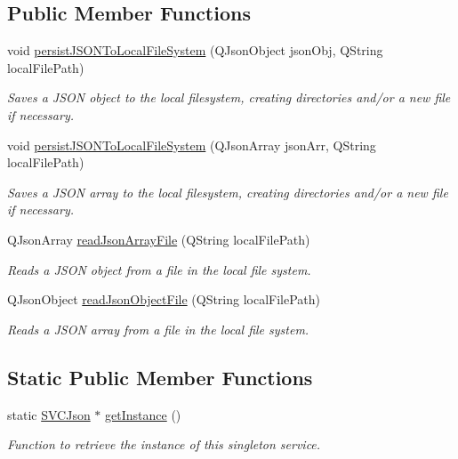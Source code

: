 \subsection*{Public Member Functions}
\begin{DoxyCompactItemize}
\item 
void \mbox{\hyperlink{class_s_v_c_json_a0977d01535e63b2cc76a0fb35cc17966}{persist\+J\+S\+O\+N\+To\+Local\+File\+System}} (Q\+Json\+Object json\+Obj, Q\+String local\+File\+Path)
\begin{DoxyCompactList}\small\item\em Saves a J\+S\+ON object to the local filesystem, creating directories and/or a new file if necessary. \end{DoxyCompactList}\item 
void \mbox{\hyperlink{class_s_v_c_json_a957845d6aad8c6acd176de1b9108bed5}{persist\+J\+S\+O\+N\+To\+Local\+File\+System}} (Q\+Json\+Array json\+Arr, Q\+String local\+File\+Path)
\begin{DoxyCompactList}\small\item\em Saves a J\+S\+ON array to the local filesystem, creating directories and/or a new file if necessary. \end{DoxyCompactList}\item 
Q\+Json\+Array \mbox{\hyperlink{class_s_v_c_json_a0f80c2f8372fdfe4158df6f49ccbe1ac}{read\+Json\+Array\+File}} (Q\+String local\+File\+Path)
\begin{DoxyCompactList}\small\item\em Reads a J\+S\+ON object from a file in the local file system. \end{DoxyCompactList}\item 
Q\+Json\+Object \mbox{\hyperlink{class_s_v_c_json_aacff71253cc41cb2a403cf2226038962}{read\+Json\+Object\+File}} (Q\+String local\+File\+Path)
\begin{DoxyCompactList}\small\item\em Reads a J\+S\+ON array from a file in the local file system. \end{DoxyCompactList}\end{DoxyCompactItemize}
\subsection*{Static Public Member Functions}
\begin{DoxyCompactItemize}
\item 
static \mbox{\hyperlink{class_s_v_c_json}{S\+V\+C\+Json}} $\ast$ \mbox{\hyperlink{class_s_v_c_json_a309123d2e8f34ba0ec02e73b024d53e5}{get\+Instance}} ()
\begin{DoxyCompactList}\small\item\em Function to retrieve the instance of this singleton service. \end{DoxyCompactList}\end{DoxyCompactItemize}


